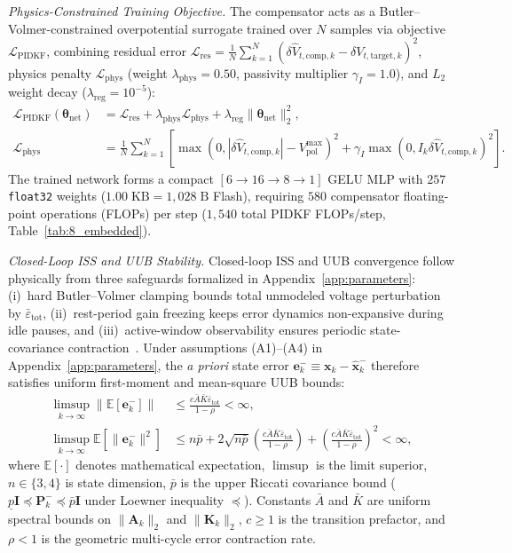 \documentclass[10pt,a4paper]{article}
\begin{document}
\emph{Physics-Constrained Training Objective.} The compensator acts as a Butler--Volmer-constrained overpotential surrogate trained over $N$ samples via objective $\mathcal{L}_{\text{PIDKF}}$, combining residual error $\mathcal{L}_{\text{res}} = \frac{1}{N}\sum_{k=1}^N (\delta\hat{V}_{t,\text{comp},k} - \delta V_{t,\text{target},k})^2$, physics penalty $\mathcal{L}_{\text{phys}}$ (weight $\lambda_{\text{phys}} = 0.50$, passivity multiplier $\gamma_I = 1.0$), and $L_2$ weight decay ($\lambda_{\text{reg}} = 10^{-5}$):
\begin{align}
\mathcal{L}_{\text{PIDKF}}(\boldsymbol{\theta}_{\text{net}}) &= \mathcal{L}_{\text{res}} + \lambda_{\text{phys}} \mathcal{L}_{\text{phys}} + \lambda_{\text{reg}} \|\boldsymbol{\theta}_{\text{net}}\|_2^2, \label{eqn:loss_pidkf}\\
\mathcal{L}_{\text{phys}} &= \frac{1}{N}\sum_{k=1}^N \left[\max\left(0, |\delta \hat{V}_{t,\text{comp},k}| - V_{\text{pol}}^{\max}\right)^2 + \gamma_I \max\left(0, I_k \delta \hat{V}_{t,\text{comp},k}\right)^2\right]. \label{eqn:loss_pidkf_phys}
\end{align}
The trained network forms a compact $[6 \rightarrow 16 \rightarrow 8 \rightarrow 1]$ GELU MLP with $257$ \texttt{float32} weights ($1.00\;\mathrm{KB} = 1,028\;\mathrm{B}$ Flash), requiring $580$ compensator floating-point operations (FLOPs) per step ($1,540$ total PIDKF FLOPs/step, Table~\ref{tab:8_embedded}).

\emph{Closed-Loop ISS and UUB Stability.} Closed-loop ISS and UUB convergence follow physically from three safeguards formalized in Appendix~\ref{app:parameters}: (i)~hard Butler--Volmer clamping bounds total unmodeled voltage perturbation by $\bar{\varepsilon}_{\text{tot}}$, (ii)~rest-period gain freezing keeps error dynamics non-expansive during idle pauses, and (iii)~active-window observability ensures periodic state-covariance contraction~\cite{Reif1999ekf}. Under assumptions (A1)--(A4) in Appendix~\ref{app:parameters}, the \emph{a priori} state error $\mathbf{e}_k^- \equiv \mathbf{x}_k - \hat{\mathbf{x}}_k^-$ therefore satisfies uniform first-moment and mean-square UUB bounds:
\begin{align}
\limsup_{k \to \infty} \|\mathbb{E}[\mathbf{e}_k^-]\| &\le \frac{c \bar{A} \bar{K} \bar{\varepsilon}_{\text{tot}}}{1 - \rho} < \infty, \label{eqn:bibs_pidkf}\\
\limsup_{k \to \infty} \mathbb{E}[\|\mathbf{e}_k^-\|^2] &\le n\bar{p} + 2\sqrt{n\bar{p}}\left(\frac{c \bar{A} \bar{K} \bar{\varepsilon}_{\text{tot}}}{1 - \rho}\right) + \left(\frac{c \bar{A} \bar{K} \bar{\varepsilon}_{\text{tot}}}{1 - \rho}\right)^2 < \infty, \label{eqn:ms_pidkf}
\end{align}
where $\mathbb{E}[\cdot]$ denotes mathematical expectation, $\limsup$ is the limit superior, $n \in \{3, 4\}$ is state dimension, $\bar{p}$ is the upper Riccati covariance bound ($\underline{p}\mathbf{I} \preceq \mathbf{P}_k^- \preceq \bar{p}\mathbf{I}$ under Loewner inequality $\preceq$). Constants $\bar{A}$ and $\bar{K}$ are uniform spectral bounds on $\|\mathbf{A}_k\|_2$ and $\|\mathbf{K}_k\|_2$, $c \ge 1$ is the transition prefactor, and $\rho < 1$ is the geometric multi-cycle error contraction rate.
\end{document}

